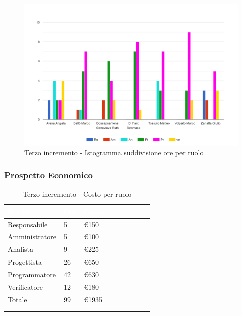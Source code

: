 {{      \begin{figure}[H]
        \includegraphics[width=15cm]{sezioni/Images/terzo.png}
        \centering
        \caption{Terzo incremento - Istogramma suddivisione ore per ruolo}
     \end{figure}
    }

    \subsubsection{Prospetto Economico}
    {
        \setlength{\freewidth}{\dimexpr\textwidth-30\tabcolsep}
        \renewcommand{\arraystretch}{1.0}
        \setlength{\aboverulesep}{0pt}
        \setlength{\belowrulesep}{0pt}
        \begin{longtable}{C{.4\freewidth} C{.2\freewidth} C{.2\freewidth} C{.2\freewidth} C{.2\freewidth} C{.2\freewidth} C{.2\freewidth} C{.2\freewidth} C{.2\freewidth}}
          \toprule
        \textcolor{white}{\textbf{Ruolo}}&
        \textcolor{white}{\textbf{Ore}}&
        \textcolor{white}{\textbf{Costo}}\\
        \toprule
        \endhead
            
        Responsabile  & 5 & €150\\
        Amministratore  & 5 & €100 \\
        Analista &9 & €225\\
        Progettista &26 & €650\\
        Programmatore &42 & €630\\
        Verificatore &12 & €180\\
        Totale&99&€1935\\
        \bottomrule
      \\
        \caption{Terzo incremento - Costo per ruolo}


\end{longtable}}}
